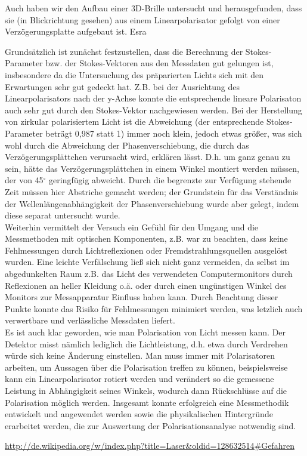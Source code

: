 \documentclass[bigchapter,colorback,accentcolor=tud4b,linedtoc,11pt]{tudreport}
\begin{document}
Auch haben wir den Aufbau einer 3D-Brille untersucht und herausgefunden, dass sie (in Blickrichtung gesehen) aus einem Linearpolarisator gefolgt von einer Verzögerungsplatte aufgebaut ist.
Esra

Grundsätzlich ist zunächst festzustellen, dass die Berechnung der Stokes-Parameter bzw. der Stokes-Vektoren aus den Messdaten gut gelungen ist, insbesondere da die Untersuchung des präparierten Lichts sich mit den Erwartungen sehr gut gedeckt hat. Z.B. bei der Ausrichtung des Linearpolarisators nach der y-Achse konnte die entsprechende lineare Polarisaton auch sehr gut durch den Stokes-Vektor nachgewiesen werden. Bei der Herstellung von zirkular polarisiertem Licht ist die Abweichung (der entsprechende Stokes-Parameter beträgt 0,987 statt 1) immer noch klein, jedoch etwas größer, was sich wohl durch die Abweichung der Phasenverschiebung, die durch das Verzögerungsplättchen verursacht wird, erklären lässt. D.h. um ganz genau zu sein, hätte das Verzögerungsplättchen in einem Winkel montiert werden müssen, der von 45$^{\circ}$ geringfügig abweicht. Durch die begrenzte zur Verfügung stehende Zeit müssen hier Abstriche gemacht werden; der Grundstein für das Verständnis der Wellenlängenabhängigkeit der Phasenverschiebung wurde aber gelegt, indem diese separat untersucht wurde.\\ 

Weiterhin vermittelt der Versuch ein Gefühl für den Umgang und die Messmethoden mit optischen Komponenten, z.B. war zu beachten, dass keine Fehlmessungen durch Lichtreflexionen oder Fremdstrahlungsquellen ausgelöst wurden. Eine leichte Verfälschung ließ sich nicht ganz vermeiden, da selbst im abgedunkelten Raum z.B. das Licht des verwendeten Computermonitors durch Reflexionen an heller Kleidung o.ä. oder durch einen ungünstigen Winkel des Monitors zur Messapparatur Einfluss haben kann. Durch Beachtung dieser Punkte konnte das Risiko für Fehlmessungen minimiert werden, was letzlich auch verwertbare und verlässliche Messdaten liefert.\\

Es ist auch klar geworden, wie man Polarisation von Licht messen kann. Der Detektor misst nämlich lediglich die Lichtleistung, d.h. etwa durch Verdrehen würde sich keine Änderung einstellen. Man muss immer mit Polarisatoren arbeiten, um Aussagen über die Polarisation treffen zu können, beispielsweise kann ein Linearpolarisator rotiert werden und verändert so die gemessene Leistung in Abhängigkeit seines Winkels, wodurch dann Rückschlüsse auf die Polarisation möglich werden. Insgesamt konnte erfolgreich eine Messmethodik entwickelt und angewendet werden sowie die physikalischen Hintergründe erarbeitet werden, die zur Auswertung der Polarisationsanalyse notwendig sind.
\cleardoublepage{}
\newpage
\begin{thebibliography}{100}
   \url{http://de.wikipedia.org/w/index.php?title=Laser&oldid=128632514#Gefahren}
\end{thebibliography}

\cleardoublepage{}
\end{document}

